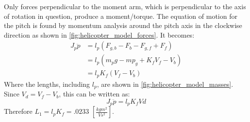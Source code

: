 %
Only forces perpendicular to the moment arm, which is
perpendicular to the axis of rotation in question, produce a moment/torque. The equation of motion for the pitch is found by
momentum analysis around the pitch axis in the clockwise direction as shown in
\cref{fig:helicopter_model_forces}. It becomes:
%
\begin{align*}
  J_p\ddot{p} &= l_p(F_{g,b} - F_b - F_{g,f} + F_f) \\
              &= l_p(m_pg - mp_g + K_fV_f - V_b) \\
              &= l_pK_f(V_f-V_b)
\end{align*}
%
Where the lengths, including $l_p$, are shown in
\cref{fig:helicopter_model_masses}. Since $V_d = V_f-V_b$, this can be written as:
%
\begin{equation}
  \label{eq:pitch EoM}
  J_p\ddot{p} = l_pK_fVd
\end{equation}
Therefore $L_1 = l_pK_f = .0233$ $[\frac{kgm^2}{Vs^2}]$.


